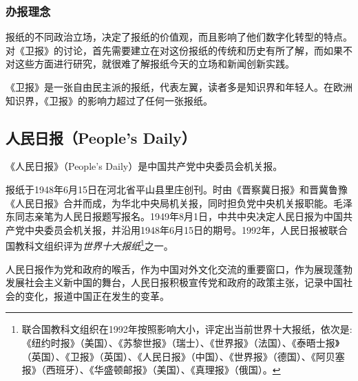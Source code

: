\documentclass[a4paper,openany]{book}
\begin{document}
\subsubsection{办报理念}

报纸的不同政治立场，决定了报纸的价值观，而且影响了他们数字化转型的特点。对《卫报》的讨论，首先需要建立在对这份报纸的传统和历史有所了解，而如果不对这些方面进行研究，就很难了解报纸今天的立场和新闻创新实践。

《卫报》是一张自由民主派的报纸，代表左翼，读者多是知识界和年轻人。在欧洲知识界，《卫报》的影响力超过了任何一张报纸。

\subsection{人民日报（People's Daily）}

《人民日报》（People's Daily）是中国共产党中央委员会机关报。

报纸于1948年6月15日在河北省平山县里庄创刊。时由《晋察冀日报》和晋冀鲁豫《人民日报》合并而成，为华北中央局机关报，同时担负党中央机关报职能。毛泽东同志亲笔为人民日报题写报名。1949年8月1日，中共中央决定人民日报为中国共产党中央委员会机关报，并沿用1948年6月15日的期号。1992年，人民日报被联合国教科文组织评为\textit{世界十大报纸}\footnote{联合国教科文组织在1992年按照影响大小，评定出当前世界十大报纸，依次是:《纽约时报》（美国）、《苏黎世报》（瑞士）、《世界报》（法国）、《泰晤士报》（英国）、《卫报》（英国）、《人民日报》（中国）、《世界报》（德国）、《阿贝塞报》（西班牙）、《华盛顿邮报》（美国）、《真理报》（俄国）。}之一。

人民日报作为党和政府的喉舌，作为中国对外文化交流的重要窗口，作为展现蓬勃发展社会主义新中国的舞台，人民日报积极宣传党和政府的政策主张，记录中国社会的变化，报道中国正在发生的变革。
\end{document}

